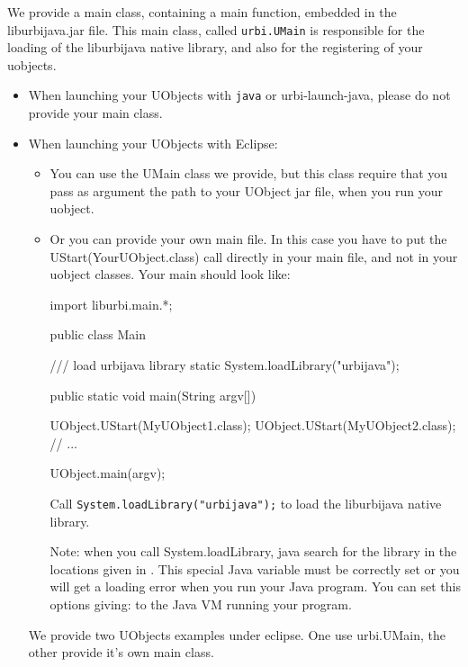 We provide a main class, containing a main function, embedded in the
liburbijava.jar file. This main class, called \lstinline{urbi.UMain} is
responsible for the loading of the liburbijava native library, and also for
the registering of your uobjects.

\begin{itemize}

\item When launching your UObjects with \lstinline{java} or
  urbi-launch-java, please do not provide your main class.

\item When launching your UObjects with Eclipse:
\begin{itemize}
\item You can use the UMain class we provide, but this class require that
  you pass as argument the path to your UObject jar file, when you run your
  uobject.
\item Or you can provide your own main file. In this case you have to put
  the UStart(YourUObject.class) call directly in your main file, and not in
  your uobject classes. Your main should look like:

\begin{java}
import liburbi.main.*;

public class Main
{
  /// load urbijava library
  static
  {
    System.loadLibrary("urbijava");
  }

  public static void main(String argv[])
  {
    UObject.UStart(MyUObject1.class);
    UObject.UStart(MyUObject2.class);
    // ...

    UObject.main(argv);
  }
}
\end{java}

Call \lstinline{System.loadLibrary("urbijava");} to load the liburbijava
native library.

Note: when you call System.loadLibrary, java search for the library in the
locations given in . This special Java variable must
be correctly set or you will get a loading error when you run your Java
program.  You can set this options giving:
 to the
Java VM running your program.


\end{itemize}

We provide two UObjects examples under eclipse. One use urbi.UMain, the
other provide it's own main class.
\end{itemize}


